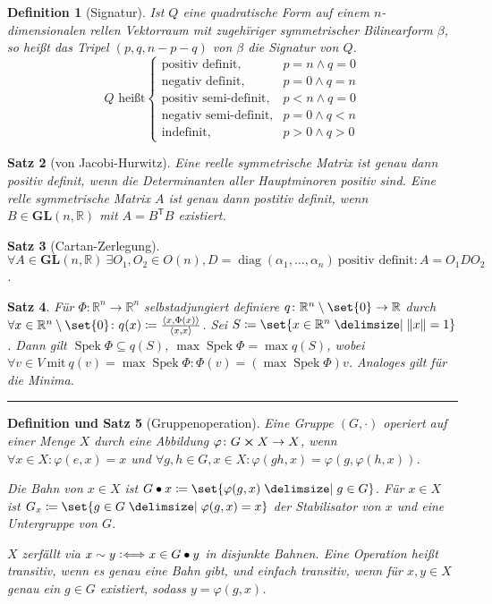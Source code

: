 \documentclass[a4paper]{article}
\newcounter{Sec}
\theoremstyle{marginbreak}
\newtheorem{definition}{Definition}[Sec]
\newtheorem{satz}[definition]{Satz}
\newtheorem{defsatz}[definition]{Definition und Satz}
\DeclareMathOperator{\Spek}{Spek}
\DeclareMathOperator{\diag}{diag}
\newcommand{\sep}{%
	\rule{\textwidth}{0.3pt}%
	\stepcounter{Sec}%
	}
\newcommand\defiff{\mathrel{\vcentcolon\Longleftrightarrow}}
\newcommand\scp[1]{\left\langle#1\right\rangle}
\newcommand\transpose[1]{#1^{\mathsf{T}}}
\begin{document}
	\begin{definition}[Signatur]
		Ist $Q$ eine quadratische Form auf einem $n$-dimensionalen rellen Vektorraum mit
		zugehïriger symmetrischer Bilinearform $\beta$, so heißt das Tripel $(p, q, n - p - q)$
		von $\beta$ die Signatur von $Q$.
		\begin{equation*}
			Q\text{ heißt}
			\begin{cases}
				\text{positiv definit}, &p = n \wedge q = 0\\
				\text{negativ definit}, &p = 0 \wedge q = n\\
				\text{positiv semi-definit}, &p < n\wedge q = 0\\
				\text{negativ semi-definit}, &p = 0\wedge q < n\\
				\text{indefinit}, &p>0\wedge q>0
			\end{cases}
		\end{equation*}
	\end{definition}
	\begin{satz}[von Jacobi-Hurwitz]
		Eine reelle symmetrische Matrix ist genau dann positiv definit, wenn die Determinanten
		aller Hauptminoren positiv sind. Eine relle symmetrische Matrix $A$ ist genau dann postitiv
		definit, wenn $B\in\mathbf{GL}(n, \mathbb{R})$ mit $A=\transpose{B}B$ existiert.
	\end{satz}
	\begin{satz}[Cartan-Zerlegung]
		$\forall A\in\mathbf{GL}(n, \mathbb{R})\ \exists O_1, O_2\in O(n), D=\diag(\alpha_1,\ldots,\alpha_n)\ \text{positiv definit}\colon
		A=O_1DO_2$.
	\end{satz}
	\begin{satz}
		Für $\Phi\colon\mathbb{R}^n\to\mathbb{R}^n$ selbstadjungiert definiere
		$q\colon\mathbb{R}^n\setminus\set{0}\to\mathbb{R}$ durch $\forall x\in\mathbb{R}^n\setminus\set{0}\colon
		q(x)\coloneqq\frac{\scp{x,\Phi(x)}}{\scp{x, x}}$. Sei $S\coloneqq\set{x\in\mathbb{R}^n\given\norm{x}=1}$.
		Dann gilt $\Spek\Phi\subseteq q(S)$,
		$\max\Spek\Phi=\max q(S)$, wobei $\forall v\in V\ \text{mit}\ q(v)=\max\Spek\Phi\colon\Phi(v)=(\max\Spek\Phi)v$.
		Analoges gilt für die Minima.
	\end{satz}
	\sep
	\begin{defsatz}[Gruppenoperation]
		Eine Gruppe $(G,\cdot)$ operiert auf einer Menge $X$ durch eine Abbildung
		$\varphi\colon G\cross X\to X$, wenn $\forall x\in X\colon\varphi(e, x)=x$ und
		$\forall g, h\in G, x\in X\colon\varphi(gh, x) = \varphi(g,\varphi(h, x))$.

		Die Bahn von $x\in X$ ist $G\bullet x\coloneqq\set{\varphi(g, x)\given g\in G}$. Für $x\in X$
		ist $G_x\coloneqq\set{g\in G\given\varphi(g, x)=x}$ der Stabilisator von $x$ und
		eine Untergruppe von $G$.

		$X$ zerfällt via $x\sim y\defiff x\in G\bullet y$ in disjunkte Bahnen. Eine
		Operation heißt transitiv, wenn es genau eine Bahn gibt, und einfach transitiv, wenn
		für $x, y\in X$ genau ein $g\in G$ existiert, sodass $y=\varphi(g, x)$.
	\end{defsatz}
\end{document}
